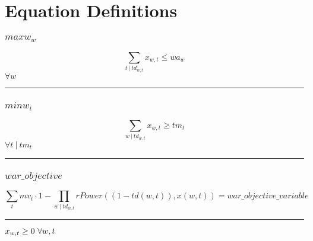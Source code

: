 \documentclass[11pt]{article}
\begin{document}
\section*{Equation Definitions}
\subsubsection*{$maxw_{w}$}
\begin{equation}
\sum_{t ~ | ~ td_{w,t}} x_{w,t} \leq wa_{w}
\end{equation}
\hfill
$
\forall w
$\vspace{5pt}
\hrule
\subsubsection*{$minw_{t}$}
\begin{equation}
\sum_{w ~ | ~ td_{w,t}} x_{w,t} \geq tm_{t}
\end{equation}
\hfill
$
\forall t ~ | ~ tm_{t} 
$\vspace{5pt}
\hrule
\subsubsection*{$war\_objective$}
\begin{equation}
\sum_{t} mv_{t} \cdot 1 - \prod_{w ~ | ~ td_{w,t}}  rPower((1 - td(w,t)),x(w,t))  = war\_objective\_variable
\end{equation}
\vspace{5pt}
\hrule
\bigskip
$x_{w,t}\geq 0 ~ \forall w,t\\$
\end{document}
